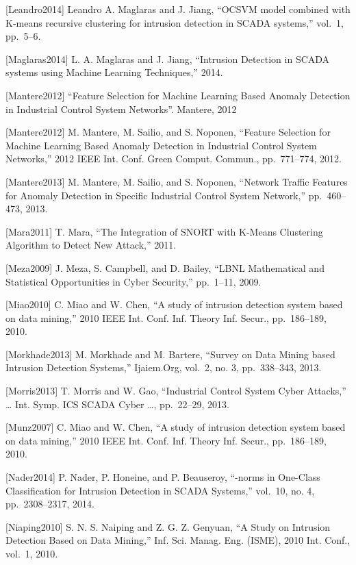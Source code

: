 \documentclass[12pt,]{article}
\begin{document}
{[}Leandro2014{]} Leandro A. Maglaras and J. Jiang, ``OCSVM model
combined with K-means recursive clustering for intrusion detection in
SCADA systems,'' vol.~1, pp.~5--6.

{[}Maglaras2014{]} L. A. Maglaras and J. Jiang, ``Intrusion Detection in
SCADA systems using Machine Learning Techniques,'' 2014.

{[}Mantere2012{]} ``Feature Selection for Machine Learning Based Anomaly
Detection in Industrial Control System Networks''. Mantere, 2012

{[}Mantere2012{]} M. Mantere, M. Sailio, and S. Noponen, ``Feature
Selection for Machine Learning Based Anomaly Detection in Industrial
Control System Networks,'' 2012 IEEE Int. Conf. Green Comput. Commun.,
pp.~771--774, 2012.

{[}Mantere2013{]} M. Mantere, M. Sailio, and S. Noponen, ``Network
Traffic Features for Anomaly Detection in Specific Industrial Control
System Network,'' pp.~460--473, 2013.

{[}Mara2011{]} T. Mara, ``The Integration of SNORT with K-Means
Clustering Algorithm to Detect New Attack,'' 2011.

{[}Meza2009{]} J. Meza, S. Campbell, and D. Bailey, ``LBNL Mathematical
and Statistical Opportunities in Cyber Security,'' pp.~1--11, 2009.

{[}Miao2010{]} C. Miao and W. Chen, ``A study of intrusion detection
system based on data mining,'' 2010 IEEE Int. Conf. Inf. Theory Inf.
Secur., pp.~186--189, 2010.

{[}Morkhade2013{]} M. Morkhade and M. Bartere, ``Survey on Data Mining
based Intrusion Detection Systems,'' Ijaiem.Org, vol.~2, no. 3,
pp.~338--343, 2013.

{[}Morris2013{]} T. Morris and W. Gao, ``Industrial Control System Cyber
Attacks,'' \ldots{} Int. Symp. ICS SCADA Cyber \ldots{}, pp.~22--29,
2013.

{[}Munz2007{]} C. Miao and W. Chen, ``A study of intrusion detection
system based on data mining,'' 2010 IEEE Int. Conf. Inf. Theory Inf.
Secur., pp.~186--189, 2010.

{[}Nader2014{]} P. Nader, P. Honeine, and P. Beauseroy, ``-norms in
One-Class Classification for Intrusion Detection in SCADA Systems,''
vol.~10, no. 4, pp.~2308--2317, 2014.

{[}Niaping2010{]} S. N. S. Naiping and Z. G. Z. Genyuan, ``A Study on
Intrusion Detection Based on Data Mining,'' Inf. Sci. Manag. Eng.
(ISME), 2010 Int. Conf., vol.~1, 2010.
\end{document}
